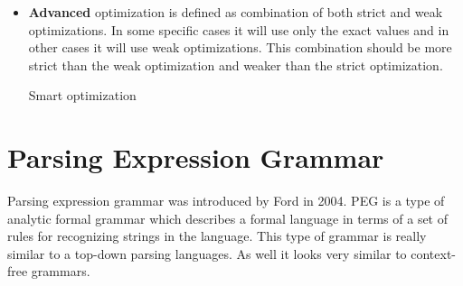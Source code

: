 \begin{itemize}
\begin{algorithm}[H]
		\caption{Weak optimization}\label{algo:weak}
	\end{algorithm}

	\item \textbf{Advanced}
	optimization is defined as combination of both strict and weak optimizations.
	In some specific cases it will use only the exact values and in other cases it will use weak optimizations.
	This combination should be more strict than the weak optimization and weaker than the strict optimization.

	\begin{algorithm}[H]



		\caption{Smart optimization}\label{algo:weak}
	\end{algorithm}
\end{itemize}





\section{Parsing Expression Grammar}
Parsing expression grammar was introduced by Ford in 2004.
PEG is a type of analytic formal grammar which describes a formal language in terms of a set of rules for recognizing strings in the language.
This type of grammar is really similar to a top-down parsing languages.
As well it looks very similar to context-free grammars.

